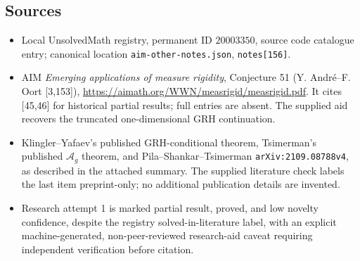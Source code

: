\documentclass[11pt]{article}
\begin{document}
\subsection{Sources}
\begin{itemize}
\item Local UnsolvedMath registry, permanent ID $20003350$, source code catalogue entry; canonical location \texttt{aim-other-notes.json}, \texttt{notes[156]}.
\item AIM \emph{Emerging applications of measure rigidity}, Conjecture 51 (Y. Andr\'e--F. Oort [3,153]), \url{https://aimath.org/WWN/measrigid/measrigid.pdf}. It cites [45,46] for historical partial results; full entries are absent. The supplied aid recovers the truncated one-dimensional GRH continuation.
\item Klingler--Yafaev's published GRH-conditional theorem, Tsimerman's published $\mathcal A_g$ theorem, and Pila--Shankar--Tsimerman \texttt{arXiv:2109.08788v4}, as described in the attached summary. The supplied literature check labels the last item preprint-only; no additional publication details are invented.
\item Research attempt 1 is marked partial result, proved, and low novelty confidence, despite the registry solved-in-literature label, with an explicit machine-generated, non-peer-reviewed research-aid caveat requiring independent verification before citation.
\end{itemize}
\end{document}
